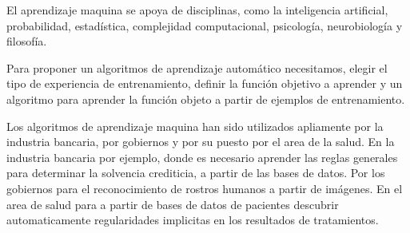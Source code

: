 El aprendizaje maquina se apoya de disciplinas, como la inteligencia artificial, probabilidad, estadística, complejidad computacional, psicología, neurobiología y filosofía.

Para proponer un algoritmos de aprendizaje automático necesitamos, elegir el tipo de experiencia de entrenamiento, definir la función objetivo a aprender y un algoritmo para aprender la función objeto a partir de ejemplos de entrenamiento.

Los algoritmos de aprendizaje maquina han sido utilizados apliamente por la industria bancaria, por gobiernos y por su puesto por el area de la salud. En la industria bancaria por ejemplo, donde es necesario aprender las reglas generales para determinar la solvencia crediticia, a partir de las bases de datos. Por los gobiernos para el reconocimiento de rostros humanos a partir de imágenes. En el area de salud para a partir de bases de datos de pacientes descubrir automaticamente regularidades implicitas en los resultados de tratamientos.





